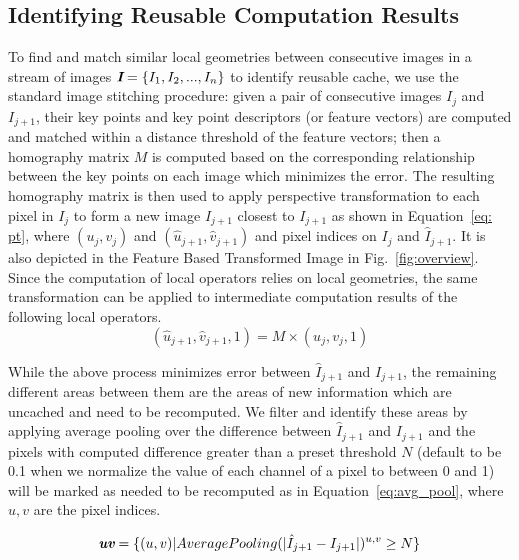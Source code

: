 
\subsection{Identifying Reusable Computation Results\label{sec:reusable cache}}
To find and match similar local geometries between consecutive images in a stream of images $\textit{\textbf{I}}=\{I_1, I_2, ..., I_n\}$ to identify reusable cache, we use the standard image stitching procedure: given a pair of consecutive images $I_j$ and $I_{j+1}$, their key points and key point descriptors (or feature vectors) are computed and matched within a distance threshold of the feature vectors; then a homography matrix $M$ is computed based on the corresponding relationship between the key points on each image which minimizes the error.
The resulting homography matrix is then used to apply perspective transformation to each pixel in $I_j$ to form a new image $\hat{I}_{j+1}$ closest to $I_{j+1}$ as shown in Equation~\ref{eq: pt}, where $(u_j,v_j)$ and $(\hat{u}_{j+1},\hat{v}_{j+1})$ and pixel indices on $I_j$ and $\hat{I}_{j+1}$.
It is also depicted in the Feature Based Transformed Image in Fig.~\ref{fig:overview}.
Since the computation of local operators relies on local geometries, the same transformation can be applied to intermediate computation results of the following local operators.
\begin{equation}
    (\hat{u}_{j+1},\hat{v}_{j+1},1) = M \times (u_j,v_j,1)
    \label{eq: pt}
\end{equation}

While the above process minimizes error between $\hat{I}_{j+1}$ and $I_{j+1}$, the remaining different areas between them are the areas of new information which are uncached and need to be recomputed.
We filter and identify these areas by applying average pooling over the difference between $\hat{I}_{j+1}$ and $I_{j+1}$ and the pixels with computed difference greater than a preset threshold $N$ (default to be 0.1 when we normalize the value of each  channel of a pixel to between 0 and 1) will be marked as needed to be recomputed as in Equation~\ref{eq:avg_pool}, where $u,v$ are the pixel indices.

\begin{equation}
    \textit{\textbf{uv}} = \{(u,v)|AveragePooling(|\hat{I}_{j+1} - I_{j+1}|)^{u,v} \geq N\}
    \label{eq:avg_pool}
\end{equation}

